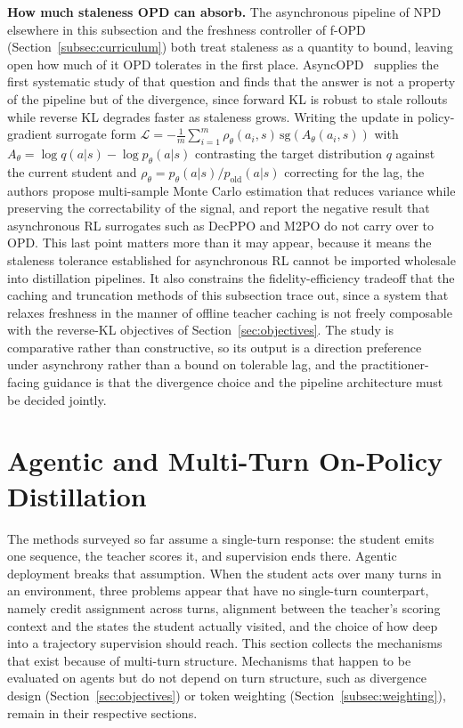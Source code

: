 \documentclass{article} %
\begin{document}
\textbf{How much staleness OPD can absorb.} The asynchronous pipeline of NPD elsewhere in this subsection and the freshness controller of f-OPD (Section~\ref{subsec:curriculum}) both treat staleness as a quantity to bound, leaving open how much of it OPD tolerates in the first place. AsyncOPD~\citep{2606.24143} supplies the first systematic study of that question and finds that the answer is not a property of the pipeline but of the divergence, since forward KL is robust to stale rollouts while reverse KL degrades faster as staleness grows. Writing the update in policy-gradient surrogate form $\mathcal{L} = -\frac{1}{m}\sum_{i=1}^{m} \rho_\theta(a_i, s)\,\mathrm{sg}(A_\theta(a_i, s))$ with $A_\theta = \log q(a|s) - \log p_\theta(a|s)$ contrasting the target distribution $q$ against the current student and $\rho_\theta = p_\theta(a|s)/p_{\text{old}}(a|s)$ correcting for the lag, the authors propose multi-sample Monte Carlo estimation that reduces variance while preserving the correctability of the signal, and report the negative result that asynchronous RL surrogates such as DecPPO and M2PO do not carry over to OPD. This last point matters more than it may appear, because it means the staleness tolerance established for asynchronous RL cannot be imported wholesale into distillation pipelines. It also constrains the fidelity-efficiency tradeoff that the caching and truncation methods of this subsection trace out, since a system that relaxes freshness in the manner of offline teacher caching is not freely composable with the reverse-KL objectives of Section~\ref{sec:objectives}. The study is comparative rather than constructive, so its output is a direction preference under asynchrony rather than a bound on tolerable lag, and the practitioner-facing guidance is that the divergence choice and the pipeline architecture must be decided jointly.

\section{Agentic and Multi-Turn On-Policy Distillation}
\label{sec:agentic}

The methods surveyed so far assume a single-turn response: the student emits one sequence, the teacher scores it, and supervision ends there. Agentic deployment breaks that assumption. When the student acts over many turns in an environment, three problems appear that have no single-turn counterpart, namely credit assignment across turns, alignment between the teacher's scoring context and the states the student actually visited, and the choice of how deep into a trajectory supervision should reach. This section collects the mechanisms that exist because of multi-turn structure. Mechanisms that happen to be evaluated on agents but do not depend on turn structure, such as divergence design (Section~\ref{sec:objectives}) or token weighting (Section~\ref{subsec:weighting}), remain in their respective sections.
\end{document}
